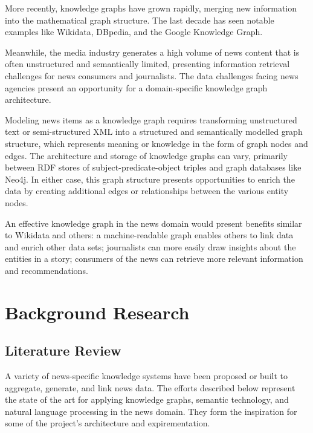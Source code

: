 \documentclass[11pt]{article}
\begin{document}
More recently, knowledge graphs have grown rapidly, merging new information into the mathematical graph structure. The last decade has seen notable examples like Wikidata, DBpedia, and the Google Knowledge Graph\cite{farber2015comparative}.

Meanwhile, the media industry generates a high volume of news content that is often unstructured and semantically limited, presenting information retrieval challenges for news consumers and journalists. The data challenges facing news agencies present an opportunity for a domain-specific knowledge graph architecture.

Modeling news items as a knowledge graph requires transforming unstructured text or semi-structured XML into a structured and semantically modelled graph structure, which represents meaning or knowledge in the form of graph nodes and edges. The architecture and storage of knowledge graphs can vary, primarily between RDF stores of subject-predicate-object triples and graph databases like Neo4j\cite{zhao2018architecture}. In either case, this graph structure presents opportunities to enrich the data by creating additional edges or relationships between the various entity nodes.

An effective knowledge graph in the news domain would present benefits similar to Wikidata and others: a machine-readable graph enables others to link data and enrich other data sets; journalists can more easily draw insights about the entities in a story; consumers of the news can retrieve more relevant information and recommendations.

\newpage
\section{Background Research}

\subsection{Literature Review}
\label{sec:LiteratureReview}

A variety of news-specific knowledge systems have been proposed or built to aggregate, generate, and link news data. The efforts described below represent the state of the art for applying knowledge graphs, semantic technology, and natural language processing in the news domain. They form the inspiration for some of the project's architecture and expirementation.
\end{document}

